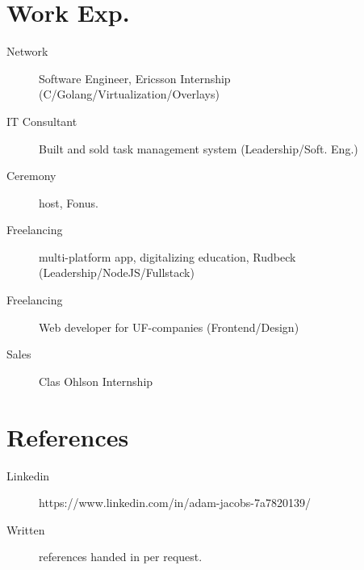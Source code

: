 \documentclass[margin,line,a4paper]{resume}
\begin{document}
\begin{resume}
\section{\mysidestyle Work Exp.}\vspace{1mm}
\begin{description}
    \item[Network] Software Engineer, Ericsson Internship (C/Golang/Virtualization/Overlays)
    \item[IT Consultant] Built and sold task management system (Leadership/Soft. Eng.)
    \item[Ceremony] host, Fonus.
    \item[Freelancing] multi-platform app, digitalizing education, Rudbeck (Leadership/NodeJS/Fullstack)
    \item[Freelancing] Web developer for UF-companies (Frontend/Design)
    \item[Sales] Clas Ohlson Internship
\end{description}

\section{\mysidestyle References}
\begin{description}
    \item[Linkedin] https://www.linkedin.com/in/adam-jacobs-7a7820139/
    \item[Written] references handed in per request.
\end{description}

\end{resume}
\end{document}
